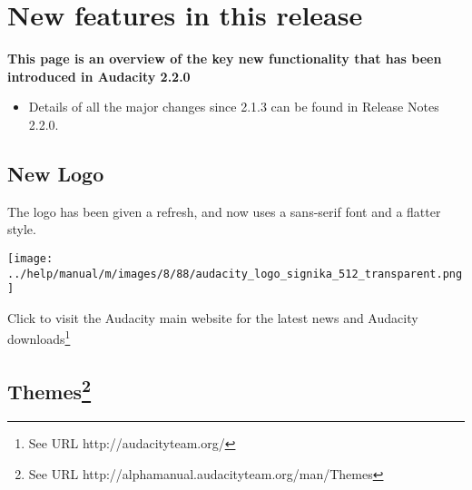 

		
			
												

				
\chapter{New features in this release}

\label{f0}								

				

\textbf{This page is an overview of the key new functionality that has been introduced in Audacity 2.2.0}

\begin{itemize}
\item  
Details of all the major changes since 2.1.3 can be found in Release Notes 2.2.0.


\end{itemize}


\section{
New Logo
}


The logo has been given a refresh, and now uses a sans-serif font and a flatter style.


 \texttt{[image: ../help/manual/m/images/8/88/audacity\_logo\_signika\_512\_transparent.png]} 
 
Click to visit the Audacity main website for  the latest news and Audacity downloads\footnote{See URL http://audacityteam.org/}


\section{
Themes\protect\footnote{See URL http://alphamanual.audacityteam.org/man/Themes}
}


